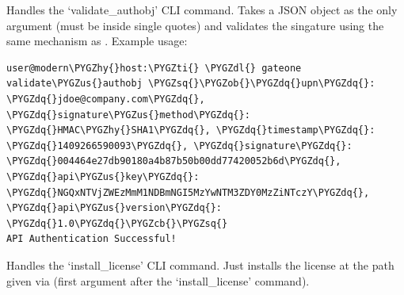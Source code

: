 \documentclass[letterpaper,10pt,openany]{sphinxmanual}
\def\PYGZus{\char`\_}
\def\PYGZob{\char`\{}
\def\PYGZcb{\char`\}}
\def\PYGZdl{\char`\$}
\def\PYGZhy{\char`\-}
\def\PYGZsq{\char`\'}
\def\PYGZdq{\char`\"}
\def\PYGZti{\char`\~}
\begin{document}
\begin{fulllineitems}
\label{Developer/server:gateone.core.server.validate_authobj}
Handles the `validate\_authobj' CLI command.  Takes a JSON object as the only
argument (must be inside single quotes) and validates the singature using
the same mechanism as {\hyperref[Developer/server:gateone.core.server.ApplicationWebSocket.api_auth]{}}.  Example usage:

\begin{Verbatim}[commandchars=\\\{\}]
user@modern\PYGZhy{}host:\PYGZti{} \PYGZdl{} gateone validate\PYGZus{}authobj \PYGZsq{}\PYGZob{}\PYGZdq{}upn\PYGZdq{}: \PYGZdq{}jdoe@company.com\PYGZdq{}, \PYGZdq{}signature\PYGZus{}method\PYGZdq{}: \PYGZdq{}HMAC\PYGZhy{}SHA1\PYGZdq{}, \PYGZdq{}timestamp\PYGZdq{}: \PYGZdq{}1409266590093\PYGZdq{}, \PYGZdq{}signature\PYGZdq{}: \PYGZdq{}004464e27db90180a4b87b50b00dd77420052b6d\PYGZdq{}, \PYGZdq{}api\PYGZus{}key\PYGZdq{}: \PYGZdq{}NGQxNTVjZWEzMmM1NDBmNGI5MzYwNTM3ZDY0MzZiNTczY\PYGZdq{}, \PYGZdq{}api\PYGZus{}version\PYGZdq{}: \PYGZdq{}1.0\PYGZdq{}\PYGZcb{}\PYGZsq{}
API Authentication Successful!
\end{Verbatim}

\end{fulllineitems}


\begin{fulllineitems}
\label{Developer/server:gateone.core.server.install_license}
Handles the `install\_license' CLI command.  Just installs the license at the
path given via  (first argument after the `install\_license'
command).

\end{fulllineitems}

\end{document}
